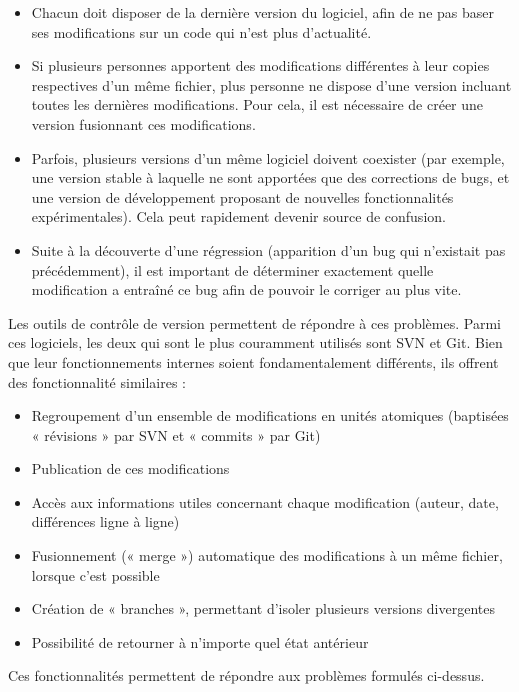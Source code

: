 \begin{itemize}
\item Chacun doit disposer de la dernière version du logiciel, afin de ne pas baser ses modifications sur un code qui n’est plus d’actualité.
\item Si plusieurs personnes apportent des modifications différentes à leur copies respectives d’un même fichier, plus personne ne dispose d’une version incluant toutes les dernières modifications. Pour cela, il est nécessaire de créer une version fusionnant ces modifications.
\item Parfois, plusieurs versions d’un même logiciel doivent coexister (par exemple, une version stable à laquelle ne sont apportées que des corrections de bugs, et une version de développement proposant de nouvelles fonctionnalités expérimentales). Cela peut rapidement devenir source de confusion.
\item Suite à la découverte d’une régression (apparition d’un bug qui n’existait pas précédemment), il est important de déterminer exactement quelle modification a entraîné ce bug afin de pouvoir le corriger au plus vite.
\end{itemize}

Les outils de contrôle de version permettent de répondre à ces problèmes. Parmi ces logiciels, les deux qui sont le plus couramment utilisés sont SVN et Git. Bien que leur fonctionnements internes soient fondamentalement différents, ils offrent des fonctionnalité similaires :

\begin{itemize}
\item Regroupement d’un ensemble de modifications en unités atomiques (baptisées « révisions » par SVN et « commits » par Git)
\item Publication de ces modifications
\item Accès aux informations utiles concernant chaque modification (auteur, date, différences ligne à ligne)
\item Fusionnement (« merge ») automatique des modifications à un même fichier, lorsque c’est possible
\item Création de « branches », permettant d’isoler plusieurs versions divergentes
\item Possibilité de retourner à n’importe quel état antérieur
\end{itemize}

Ces fonctionnalités permettent de répondre aux problèmes formulés ci-dessus.

